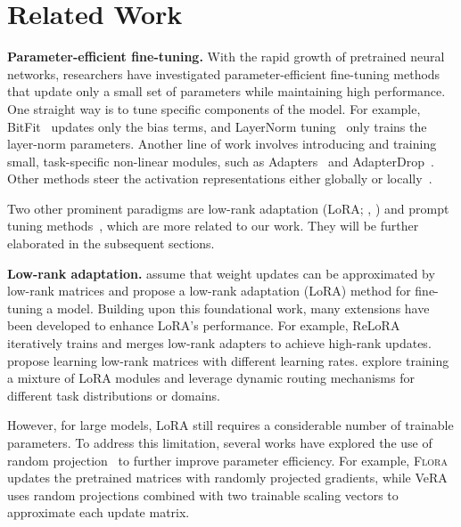 \section{Related Work}
\textbf{Parameter-efficient fine-tuning.}
With the rapid growth of pretrained neural networks, researchers have investigated parameter-efficient fine-tuning methods that update only a small set of parameters while maintaining high performance. One straight way is to tune specific components of the model. For example, BitFit~\cite{ben-zaken-etal-2022-bitfit} updates only the bias terms, and LayerNorm tuning~\cite{zhao2024tuning} only trains the layer-norm parameters.
Another line of work involves introducing and training small, task-specific non-linear modules, such as Adapters~\cite{pmlr-v97-houlsby19a} and AdapterDrop~\cite{ruckle-etal-2021-adapterdrop}. Other methods steer the activation representations either globally or locally~\cite{wu2024reft, yin2024lofit}.

Two other prominent paradigms are low-rank adaptation (LoRA; \citeauthor{hu2022lora}, \citeyear{hu2022lora}) and prompt tuning methods~\cite{lester-etal-2021-power}, which are more related to our work. They will be further elaborated in the subsequent sections. 


\textbf{Low-rank adaptation.} \citet{hu2022lora} assume that weight updates can be approximated by low-rank matrices and propose a low-rank adaptation (LoRA) method for fine-tuning a model.  Building upon this foundational work, many extensions have been developed to enhance LoRA’s performance. For example, ReLoRA~\cite{lialin2024relora} iteratively trains and merges low-rank adapters to achieve high-rank updates. 
\citet{hayou2024lora} propose learning low-rank matrices with different learning rates.
\citet{wu2024mixture} explore training a mixture of LoRA modules and leverage dynamic routing mechanisms for different task distributions or domains.

However, for large models, LoRA still requires a considerable number of trainable parameters. To address this limitation, several works have explored the use of random projection~\cite{10.1145/502512.502546} to further improve parameter efficiency. For example, \textsc{Flora}~\cite{hao2024flora} updates the pretrained matrices with randomly projected gradients, while VeRA~\cite{kopiczko2024vera} uses random projections combined with two trainable scaling vectors to approximate each update matrix. 

